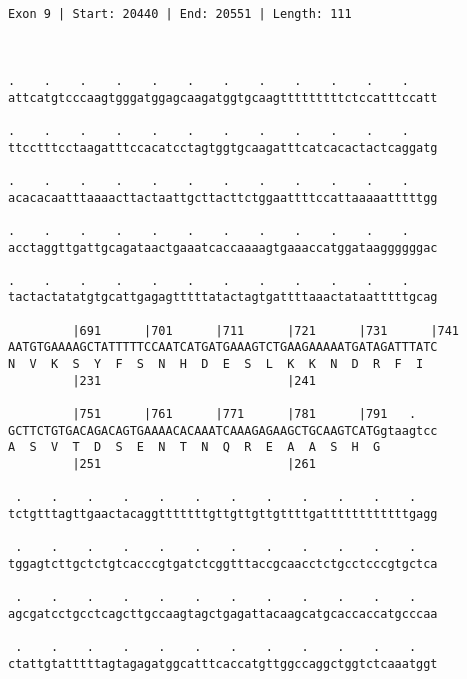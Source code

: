 \documentclass{article}
\begin{document}
\begin{Verbatim}
                                                  
 
Exon 9 | Start: 20440 | End: 20551 | Length: 111



.    .    .    .    .    .    .    .    .    .    .    .    
attcatgtcccaagtgggatggagcaagatggtgcaagtttttttttctccatttccatt
                                                            
.    .    .    .    .    .    .    .    .    .    .    .    
ttcctttcctaagatttccacatcctagtggtgcaagatttcatcacactactcaggatg
                                                            
.    .    .    .    .    .    .    .    .    .    .    .    
acacacaatttaaaacttactaattgcttacttctggaattttccattaaaaatttttgg
                                                            
.    .    .    .    .    .    .    .    .    .    .    .    
acctaggttgattgcagataactgaaatcaccaaaagtgaaaccatggataaggggggac
                                                            
.    .    .    .    .    .    .    .    .    .    .    .    
tactactatatgtgcattgagagtttttatactagtgattttaaactataatttttgcag
                                                            
         |691      |701      |711      |721      |731      |741
AATGTGAAAAGCTATTTTTCCAATCATGATGAAAGTCTGAAGAAAAATGATAGATTTATC
N  V  K  S  Y  F  S  N  H  D  E  S  L  K  K  N  D  R  F  I  
         |231                          |241                 
  
         |751      |761      |771      |781      |791   .   
GCTTCTGTGACAGACAGTGAAAACACAAATCAAAGAGAAGCTGCAAGTCATGgtaagtcc
A  S  V  T  D  S  E  N  T  N  Q  R  E  A  A  S  H  G        
         |251                          |261                 
  
 .    .    .    .    .    .    .    .    .    .    .    .   
tctgtttagttgaactacaggtttttttgttgttgttgttttgattttttttttttgagg
                                                            
 .    .    .    .    .    .    .    .    .    .    .    .   
tggagtcttgctctgtcacccgtgatctcggtttaccgcaacctctgcctcccgtgctca
                                                            
 .    .    .    .    .    .    .    .    .    .    .    .   
agcgatcctgcctcagcttgccaagtagctgagattacaagcatgcaccaccatgcccaa
                                                            
 .    .    .    .    .    .    .    .    .    .    .    .   
ctattgtatttttagtagagatggcatttcaccatgttggccaggctggtctcaaatggt
                                                            

\end{Verbatim}
\end{document}
